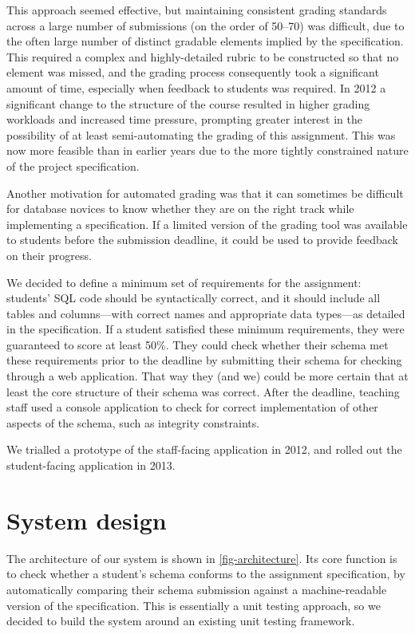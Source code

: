 \documentclass[sigconf, review, anonymous, capitalise]{acmart}
\begin{document}
This approach seemed effective, but maintaining consistent grading standards across a large number of submissions (on the order of 50--70) was difficult, due to the often large number of distinct gradable elements implied by the specification. This required a complex and highly-detailed rubric to be constructed so that no element was missed, and the grading process consequently took a significant amount of time, especially when feedback to students was required. In 2012 a significant change to the structure of the course resulted in higher grading workloads and increased time pressure, prompting greater interest in the possibility of at least semi-automating the grading of this assignment. This was now more feasible than in earlier years due to the more tightly constrained nature of the project specification.

Another motivation for automated grading was that it can sometimes be difficult for database novices to know whether they are on the right track while implementing a specification. If a limited version of the grading tool was available to students before the submission deadline, it could be used to provide feedback on their progress.

We decided to define a minimum set of requirements for the assignment: students' SQL code should be syntactically correct, and it should include all tables and columns---with correct names and appropriate data types---as detailed in the specification. If a student satisfied these minimum requirements, they were guaranteed to score at least 50\%. They could check whether their schema met these requirements prior to the deadline by submitting their schema for checking through a web application. That way they (and we) could be more certain that at least the core structure of their schema was correct. After the deadline, teaching staff used a console application to check for correct implementation of other aspects of the schema, such as integrity constraints.

We trialled a prototype of the staff-facing application in 2012, and rolled out the student-facing application in 2013.


\section{System design}
\label{sec-design}

The architecture of our system is shown in \cref{fig-architecture}. Its core function is to check whether a student's schema conforms to the assignment specification, by automatically comparing their schema submission against a machine-readable version of the specification. This is essentially a unit testing approach, so we decided to build the system around an existing unit testing framework.
\end{document}
